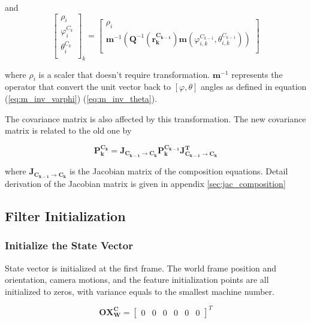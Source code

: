 \noindent and
\begin{equation}
\begin{bmatrix}
\rho_{i} \\
\varphi_{i}^{C_{k}} \\
\theta_{i}^{C_{k}} \\
\end{bmatrix}_{k}=
\begin{bmatrix}
\rho _{i} \\
\mathbf{m}^{-1}\left(\mathbf{Q}^{-1}(\mathbf{r_k^{C_{k-1}}})\mathbf{m}(\varphi _{i, k}^{C_{k-1}}, \theta _{i, k}^{C_{k-1}})\right) \\
\end{bmatrix}
\end{equation}

\noindent where $\rho_i$ is a scaler that doesn't require transformation.
$\mathbf{m}^{-1}$ represents the operator that convert
the unit vector back to $[\varphi, \theta]$ angles as defined in
equation (\ref{eq:m_inv_varphi}) (\ref{eq:m_inv_theta}).

The covariance matrix is also affected by this transformation. The new
covariance matrix is related to the old one by

\begin{equation}
\mathbf{P_{k}^{C_{k}}}=\mathbf{J_{C_{k-1}\to C_{k}}}\mathbf{P_{k}^{C_{k-1}}}\mathbf{J_{C_{k-1}\to C_{k}}^{T}}
\end{equation}

\noindent where $\mathbf{J_{C_{k-1} \to C_k}}$ is the Jacobian matrix of the
composition equations. Detail derivation of the Jacobian matrix is
given in appendix \ref{sec:jac_composition}  

\subsection{Filter Initialization} \label{sec:filter_initialization}
\subsubsection{Initialize the State Vector}

State vector is initialized at the first frame. The world frame
position and orientation, camera motions, and the feature
initialization points are all initialized to zeros, with variance
equals to the smallest machine number.

\begin{equation}
\label{eq:OX_init}
\mathbf{OX_{W}^{C}}=\begin{bmatrix}0&0&0&0&0&0\end{bmatrix}^T 
\end{equation}

